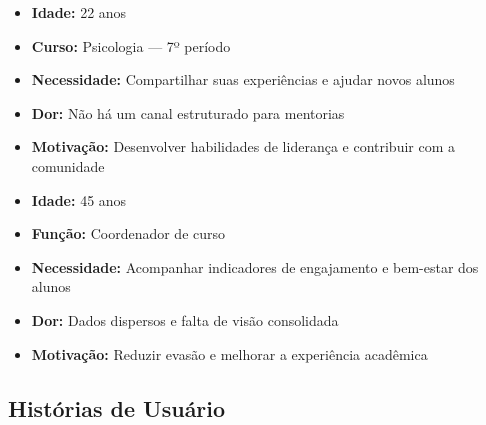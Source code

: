 \documentclass[12pt, a4paper]{article}
\begin{document}
\begin{destaque}
\begin{itemize}
    \item \textbf{Idade:} 22 anos
    \item \textbf{Curso:} Psicologia --- 7º período
    \item \textbf{Necessidade:} Compartilhar suas experiências e ajudar novos alunos
    \item \textbf{Dor:} Não há um canal estruturado para mentorias
    \item \textbf{Motivação:} Desenvolver habilidades de liderança e contribuir com a comunidade
\end{itemize}
\end{destaque}

\begin{destaque}
\begin{itemize}
    \item \textbf{Idade:} 45 anos
    \item \textbf{Função:} Coordenador de curso
    \item \textbf{Necessidade:} Acompanhar indicadores de engajamento e bem-estar dos alunos
    \item \textbf{Dor:} Dados dispersos e falta de visão consolidada
    \item \textbf{Motivação:} Reduzir evasão e melhorar a experiência acadêmica
\end{itemize}
\end{destaque}

\subsection{Histórias de Usuário}
\end{document}
